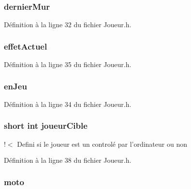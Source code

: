 \hypertarget{struct_joueur_aa553baa99ef59f8f7eb2faed9255e488}{
\subsubsection[{dernier\-Mur}]{ dernier\-Mur}}\label{struct_joueur_aa553baa99ef59f8f7eb2faed9255e488}


Définition à la ligne 32 du fichier Joueur.\-h.

\hypertarget{struct_joueur_a68df5c8befc6f20c5ff23f430e44bd9b}{
\subsubsection[{effet\-Actuel}]{ effet\-Actuel}}\label{struct_joueur_a68df5c8befc6f20c5ff23f430e44bd9b}


Définition à la ligne 35 du fichier Joueur.\-h.

\hypertarget{struct_joueur_af68c300bda7f71d66df972be408b8ec9}{
\subsubsection[{en\-Jeu}]{ en\-Jeu}}\label{struct_joueur_af68c300bda7f71d66df972be408b8ec9}


Définition à la ligne 34 du fichier Joueur.\-h.

\hypertarget{struct_joueur_a92b55b201709dd3df1e01da0264d4b35}{
\subsubsection[{joueur\-Cible}]{\setlength{\rightskip}{0pt plus 5cm}short int joueur\-Cible}}\label{struct_joueur_a92b55b201709dd3df1e01da0264d4b35}
!$<$ Defini si le joueur est un controlé par l'ordinateur ou non 

Définition à la ligne 38 du fichier Joueur.\-h.

\hypertarget{struct_joueur_af591d7daa785db91725b80343fc38fed}{
\subsubsection[{moto}]{ moto}}\label{struct_joueur_af591d7daa785db91725b80343fc38fed}


